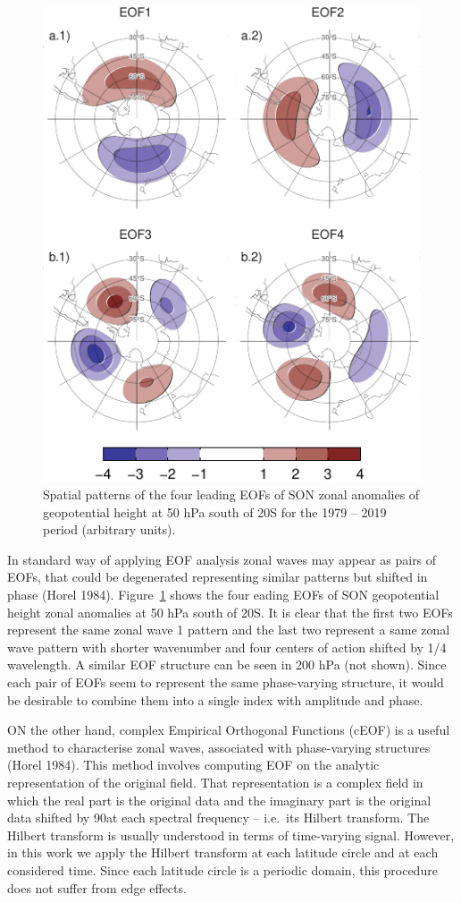 \documentclass[smallextended]{svjour3}       %
\begin{document}
\begin{figure}
\centering
\includegraphics{../figures/eof-naive-1.pdf}
\caption{\label{fig:eof-naive}Spatial patterns of the four leading EOFs of SON zonal anomalies of geopotential height at 50 hPa south of 20\degree S for the 1979 -- 2019 period (arbitrary units).}
\end{figure}

In standard way of applying EOF analysis zonal waves may appear as pairs of EOFs, that could be degenerated representing similar patterns but shifted in phase (Horel 1984).
Figure~\ref{fig:eof-naive} shows the four eading EOFs of SON geopotential height zonal anomalies at 50 hPa south of 20\degree S.
It is clear that the first two EOFs represent the same zonal wave 1 pattern and the last two represent a same zonal wave pattern with shorter wavenumber and four centers of action shifted by 1/4 wavelength.
A similar EOF structure can be seen in 200 hPa (not shown).
Since each pair of EOFs seem to represent the same phase-varying structure, it would be desirable to combine them into a single index with amplitude and phase.

ON the other hand, complex Empirical Orthogonal Functions (cEOF) is a useful method to characterise zonal waves, associated with phase-varying structures (Horel 1984).
This method involves computing EOF on the analytic representation of the original field.
That representation is a complex field in which the real part is the original data and the imaginary part is the original data shifted by 90\degree at each spectral frequency -- i.e.~its Hilbert transform.
The Hilbert transform is usually understood in terms of time-varying signal.
However, in this work we apply the Hilbert transform at each latitude circle and at each considered time.
Since each latitude circle is a periodic domain, this procedure does not suffer from edge effects.
\end{document}
